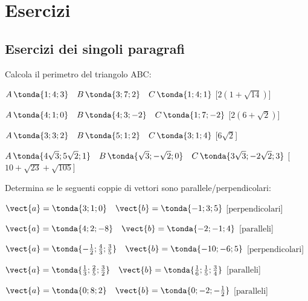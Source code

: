 

\section{Esercizi}

\subsection{Esercizi dei singoli paragrafi}

\begin{esercizio}
Calcola il perimetro del triangolo ABC:
 \begin{enumeratea}
  \item  \(A\,\tonda{1;4;3} \quad B\,\tonda{3;7;2}\quad C\,\tonda{1;4;1}\) \hfill [\(2(1+\sqrt{14}) \)]
  \item  \(A\,\tonda{4;1;0} \quad B\,\tonda{4;3;-2}\quad C\,\tonda{1;7;-2}\) \hfill [\(2(6+\sqrt{2}) \)]
  \item  \(A\,\tonda{3;3;2} \quad B\,\tonda{5;1;2}\quad C\,\tonda{3;1;4}\) \hfill [\(6\sqrt{2} \)]
   \item  \(A\,\tonda{4\sqrt{3};5\sqrt{2};1} \quad B\,\tonda{\sqrt{3};-\sqrt{2};0}\quad C\,\tonda{3\sqrt{3};-2\sqrt{2};3}\) \hfill [\(10+\sqrt{23}+\sqrt{105} \)]
 \end{enumeratea}
\end{esercizio}

\begin{esercizio}
Determina se le seguenti coppie di vettori sono parallele/perpendicolari:
 \begin{enumeratea}
  \item  \(\vect{a} = \tonda{3;1;0} \quad \vect{b} = \tonda{-1;3;5}\)   \hfill [\(\text{perpendicolari} \)]
  \item  \(\vect{a} = \tonda{4;2;-8} \quad \vect{b} = \tonda{-2;-1;4}\)   \hfill [\(\text{paralleli} \)]
  \item  \(\vect{a} = \tonda{-\frac{1}{2};\frac{4}{3};\frac{3}{5}} \quad \vect{b} = \tonda{-10;-6;5}\)   \hfill [\(\text{perpendicolari} \)]
  \item  \(\vect{a} = \tonda{\frac{1}{3};\frac{2}{5};\frac{3}{2}} \quad \vect{b} = \tonda{\frac{1}{6};\frac{1}{5};\frac{3}{4}}\)   \hfill [\(\text{paralleli} \)]
  \item  \(\vect{a} = \tonda{0;8;2} \quad \vect{b} = \tonda{0;-2;-\frac{1}{2}}\)   \hfill [\(\text{paralleli} \)]
 \end{enumeratea}
\end{esercizio}

